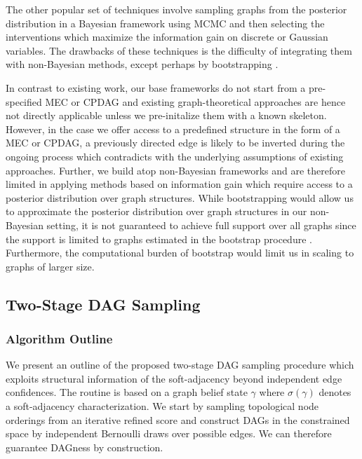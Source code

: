 \documentclass[nohyperref]{article}
\theoremstyle{plain}
\theoremstyle{definition}
\theoremstyle{remark}
\begin{document}
The other popular set of techniques involve sampling graphs from the posterior distribution in a Bayesian framework using MCMC and then selecting the interventions which maximize the information gain on discrete \citep{murphy2001active, tong2001active} or Gaussian \citep{cho2016reconstructing} variables. The drawbacks of these techniques is the difficulty of integrating them with non-Bayesian methods, except perhaps by bootstrapping \citep{agrawal2019abcd}.

In contrast to existing work, our base frameworks do not start from a pre-specified MEC or CPDAG and existing graph-theoretical approaches are hence not directly applicable unless we pre-initalize them with a known skeleton. However, in the case we offer access to a predefined structure in the form of a MEC or CPDAG, a previously directed edge is likely to be inverted during the ongoing process which contradicts with the underlying assumptions of existing approaches. Further, we build atop non-Bayesian frameworks and are therefore limited in applying methods based on information gain which require access to a posterior distribution over graph structures. While bootstrapping would allow us to approximate the posterior distribution over graph structures in our non-Bayesian setting, it is not guaranteed to achieve full support over all graphs since the support is limited to graphs estimated in the bootstrap procedure \citep{agrawal2019abcd}. Furthermore, the computational burden of bootstrap would limit us in scaling to graphs of larger size.



\clearpage
\subsection{Two-Stage DAG Sampling}
\label{sec:appendix_DAGSampling}
\subsubsection{Algorithm Outline}
We present an outline of the proposed two-stage DAG sampling procedure which exploits structural information of the soft-adjacency beyond independent edge confidences. The routine is based on a graph belief state $\gamma$ where $\sigma(\gamma)$ denotes a soft-adjacency characterization. We start by sampling topological node orderings from an iterative refined score and construct DAGs in the constrained space by independent Bernoulli draws over possible edges. We can therefore guarantee DAGness by construction.
\end{document}
